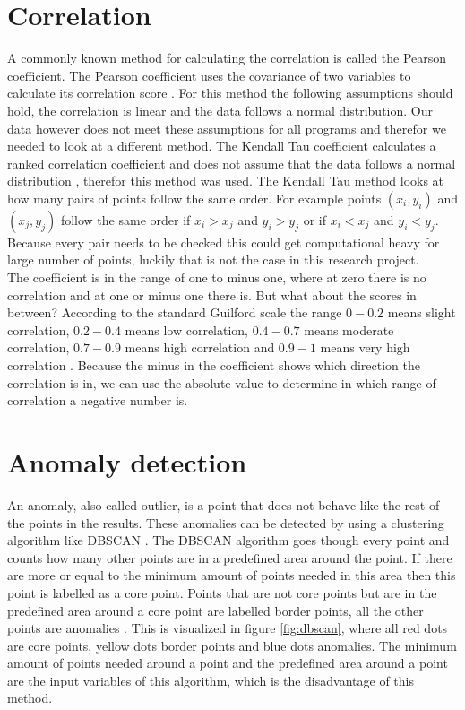 \section{Correlation}
A commonly known method for calculating the correlation is called the Pearson coefficient. The Pearson coefficient uses the covariance of two variables to calculate its correlation score \cite{pearson1929some}. For this method the following assumptions should hold, the correlation is linear and the data follows a normal distribution. Our data however does not meet these assumptions for all programs and therefor we needed to look at a different method. The Kendall Tau coefficient calculates a ranked correlation coefficient and does not assume that the data follows a normal distribution \cite{kendall1938new}, therefor this method was used. The Kendall Tau method looks at how many pairs of points follow the same order. For example points $(x_i, y_i)$ and $(x_j, y_j)$ follow the same order if $x_i > x_j$ and $y_i > y_j$ or if $x_i < x_j$ and $y_i < y_j$. Because every pair needs to be checked this could get computational heavy for large number of points, luckily that is not the case in this research project.\\

The coefficient is in the range of one to minus one, where at zero there is no correlation and at one or minus one there is. But what about the scores in between? According to the standard Guilford scale the range $0-0.2$ means slight correlation, $0.2-0.4$ means low correlation, $0.4-0.7$ means moderate correlation, $0.7-0.9$ means high correlation and $0.9-1$ means very high correlation \cite{guilford1950fundamental}. Because the minus in the coefficient shows which direction the correlation is in, we can use the absolute value to determine in which range of correlation a negative number is. 

\section{Anomaly detection}
An anomaly, also called outlier, is a point that does not behave like the rest of the points in the results. These anomalies can be detected by using a clustering algorithm like DBSCAN \cite{chandola2009anomaly}. The DBSCAN algorithm goes though every point and counts how many other points are in a predefined area around the point. If there are more or equal to the minimum amount of points needed in this area then this point is labelled as a core point. Points that are not core points but are in the predefined area around a core point are labelled border points, all the other points are anomalies \cite{ester1996density}. This is visualized in figure \ref{fig:dbscan}, where all red dots are core points, yellow dots border points and blue dots anomalies. The minimum amount of points needed around a point and the predefined area around a point are the input variables of this algorithm, which is the disadvantage of this method.

